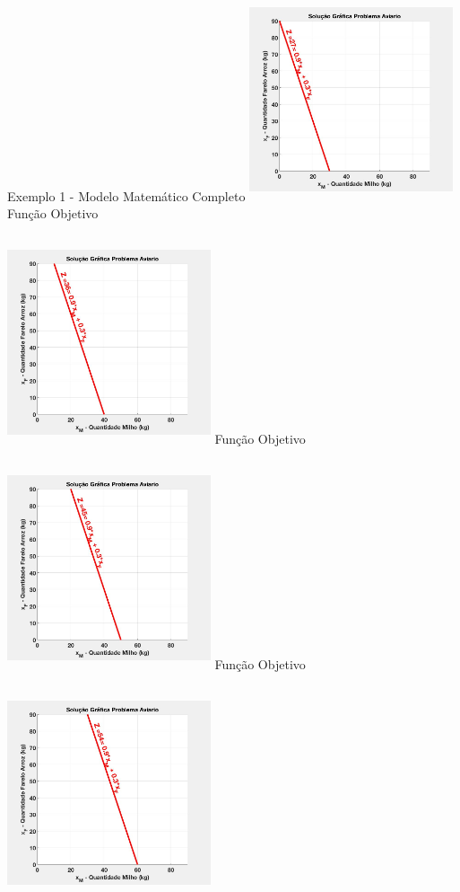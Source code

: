 \documentclass{beamer}
\begin{document}
\begin{frame}
\begin{columns}
\begin{column}{0.8\textwidth}
\begin{exampleblock}{Exemplo 1 - Modelo Matemático Completo}
{					\includegraphics[width=6cm,height=6cm]{MatLab/aviario_3.png}
				}
				\only<6>
				{	
					Função Objetivo \\~\\
					\includegraphics[width=6cm,height=6cm]{MatLab/aviario_4.png}
				}
				\only<7>
				{	
					Função Objetivo \\~\\
					\includegraphics[width=6cm,height=6cm]{MatLab/aviario_5.png}
				}
				\only<8>
				{	
					Função Objetivo \\~\\
					\includegraphics[width=6cm,height=6cm]{MatLab/aviario_6.png}
}
\end{exampleblock}
\end{column}
\end{columns}
\end{frame}
\end{document}

